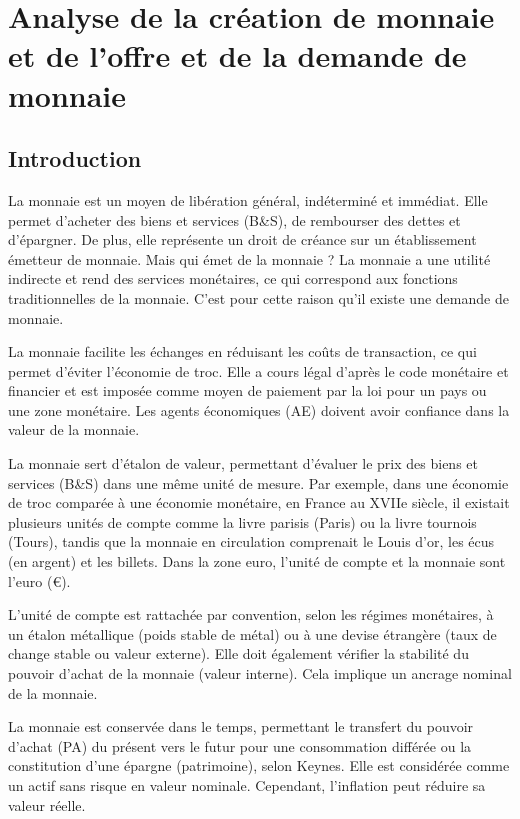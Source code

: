 \documentclass[a4paper, 12pt]{report}
\begin{document}
	
\chapter{Analyse de la création de	monnaie et de l'offre et de la demande de monnaie}
	
\section*{Introduction}


La monnaie est un moyen de libération général, indéterminé et immédiat. Elle permet d'acheter des biens et services (B\&S), de rembourser des dettes et d'épargner. De plus, elle représente un droit de créance sur un établissement émetteur de monnaie. Mais qui émet de la monnaie ? La monnaie a une utilité indirecte et rend des services monétaires, ce qui correspond aux fonctions traditionnelles de la monnaie. C'est pour cette raison qu'il existe une demande de monnaie.

La monnaie facilite les échanges en réduisant les coûts de transaction, ce qui permet d'éviter l'économie de troc. Elle a cours légal d'après le code monétaire et financier et est imposée comme moyen de paiement par la loi pour un pays ou une zone monétaire. Les agents économiques (AE) doivent avoir confiance dans la valeur de la monnaie.

La monnaie sert d'étalon de valeur, permettant d'évaluer le prix des biens et services (B\&S) dans une même unité de mesure. Par exemple, dans une économie de troc comparée à une économie monétaire, en France au XVIIe siècle, il existait plusieurs unités de compte comme la livre parisis (Paris) ou la livre tournois (Tours), tandis que la monnaie en circulation comprenait le Louis d'or, les écus (en argent) et les billets. Dans la zone euro, l'unité de compte et la monnaie sont l'euro (\euro).

L'unité de compte est rattachée par convention, selon les régimes monétaires, à un étalon métallique (poids stable de métal) ou à une devise étrangère (taux de change stable ou valeur externe). Elle doit également vérifier la stabilité du pouvoir d'achat de la monnaie (valeur interne). Cela implique un ancrage nominal de la monnaie.

La monnaie est conservée dans le temps, permettant le transfert du pouvoir d'achat (PA) du présent vers le futur pour une consommation différée ou la constitution d'une épargne (patrimoine), selon Keynes. Elle est considérée comme un actif sans risque en valeur nominale. Cependant, l'inflation peut réduire sa valeur réelle.
\end{document}
